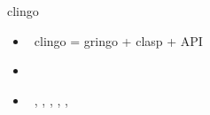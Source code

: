 \begin{frame}{clingo}
  \begin{itemize}
  \item {} \ clingo = gringo + clasp + API
  \item {} \cite{gekakasc17a,jakaosscscwa17a,karoscwa21a}
  \item {} \ \python, \cpp, \lua, \rust, \java, \prolog
  \end{itemize}
\end{frame}
%
